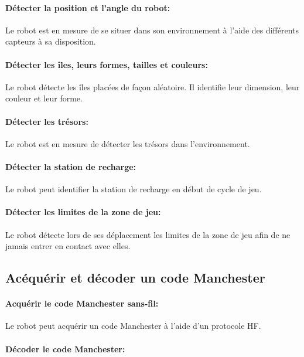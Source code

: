\paragraph{Détecter la position et l'angle du robot:}

Le robot est en mesure de se situer dans son environnement à l'aide des différents capteurs à sa disposition.

\paragraph{Détecter les îles, leurs formes, tailles et couleurs:}

Le robot détecte les îles placées de façon aléatoire. Il identifie leur dimension, leur couleur et leur forme.

\paragraph{Détecter les trésors:}

Le robot est en mesure de détecter les trésors dans l'environnement.

\paragraph{Détecter la station de recharge:}

Le robot peut identifier la station de recharge en début de cycle de jeu.

\paragraph{Détecter les limites de la zone de jeu:}

Le robot détecte lors de ses déplacement les limites de la zone de jeu afin de ne jamais entrer en contact avec elles.

\subsection{Acéquérir et décoder un code Manchester}

\paragraph{Acquérir le code Manchester sans-fil:}

Le robot peut acquérir un code Manchester à l'aide d'un protocole HF.

\paragraph{Décoder le code Manchester:}

